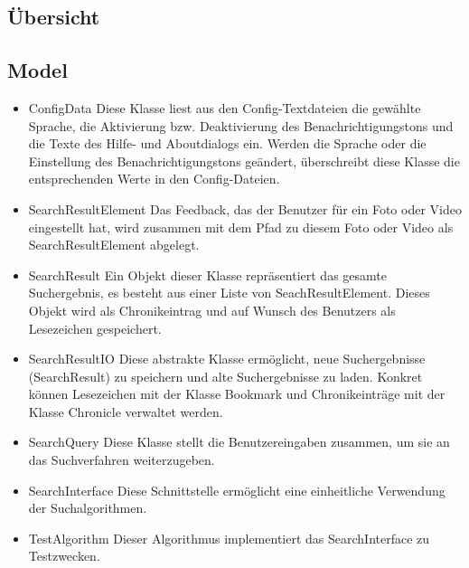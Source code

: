 \subsection{Übersicht}

\subsection{Model}
\begin{itemize}

	\item ConfigData \newline
Diese Klasse liest aus den Config-Textdateien die gewählte Sprache, die Aktivierung bzw. Deaktivierung des Benachrichtigungstons und die Texte des Hilfe- und Aboutdialogs ein.
Werden die Sprache oder die Einstellung des Benachrichtigungstons geändert, überschreibt diese Klasse die entsprechenden Werte in den Config-Dateien.

	\item SearchResultElement \newline
Das Feedback, das der Benutzer für ein Foto oder Video eingestellt hat, wird zusammen mit dem Pfad zu diesem Foto oder Video als SearchResultElement abgelegt.

	\item SearchResult \newline
Ein Objekt dieser Klasse repräsentiert das gesamte Suchergebnis, es besteht aus einer Liste von SeachResultElement. Dieses Objekt wird als Chronikeintrag und auf Wunsch des Benutzers als Lesezeichen gespeichert.

	\item SearchResultIO \newline
Diese abstrakte Klasse ermöglicht, neue Suchergebnisse (SearchResult) zu speichern und alte Suchergebnisse zu laden. Konkret können Lesezeichen mit der Klasse Bookmark und Chronikeinträge mit der Klasse Chronicle verwaltet werden.

	\item SearchQuery \newline
Diese Klasse stellt die Benutzereingaben zusammen, um sie an das Suchverfahren weiterzugeben.

	\item SearchInterface \newline
Diese Schnittstelle ermöglicht eine einheitliche Verwendung der Suchalgorithmen.

	\item TestAlgorithm \newline
Dieser Algorithmus implementiert das SearchInterface zu Testzwecken.


\end{itemize}
